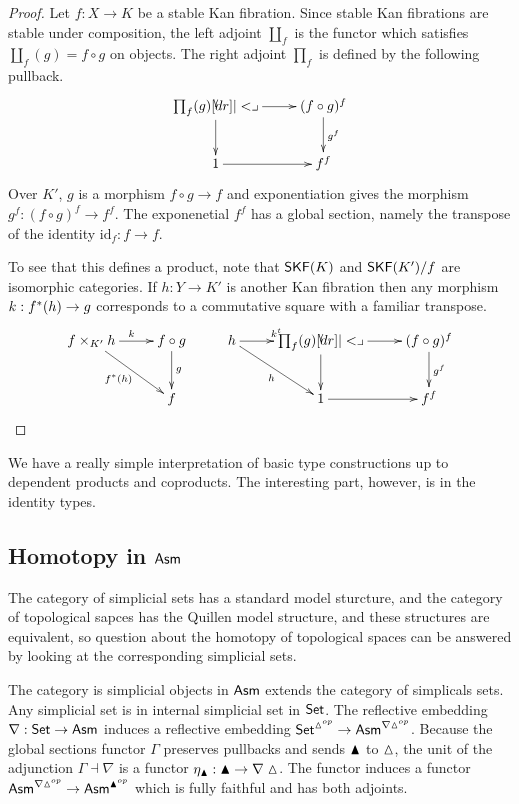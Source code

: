 \documentclass{amsart}
\theoremstyle{plain}
\theoremstyle{definition}
\newcommand\hide[1]{}
\newcommand\id{\mathrm{id}}
\begin{document}
\begin{proof} Let $f:X\to K$ be a stable Kan fibration. Since stable Kan fibrations are stable under composition, the left adjoint $\coprod_f$ is the functor which satisfies $\coprod_f(g) = f\circ g$ on objects. The right adjoint $\prod_f$ is defined by the following pullback.
\[\xymatrix{
\prod_f(g)\ar[r]\ar[d]\pb & (f\circ g)^f \ar[d]^{g^f} \\
1 \ar[r] & f^f
}\]
Over $K'$, $g$ is a morphism $f\circ g \to f$ and exponentiation gives the morphism $g^f: (f\circ g)^f \to f^f$. The exponenetial $f^f$ has a global section, namely the transpose of the identity $\id_f:f\to f$.

To see that this defines a product, note that $\mathsf{SKF}(K)$ and $\mathsf{SKF}(K')/f$ are isomorphic categories. If $h:Y\to K'$ is another Kan fibration then any morphism $k:f^*(h) \to g$ corresponds to a commutative square with a familiar transpose.
\[ \xymatrix{
f\times_{K'} h\ar[dr]_{f\ri(h)}\ar[r]^k & f\circ g \ar[d]^g & h \ar[r]^{k^t}\ar[dr]_h & \prod_f(g)\ar[r]\ar[d]\pb & (f\circ g)^f \ar[d]^{g^f} \\
& f & & 1 \ar[r] & f^f
}\]

\end{proof}\hide{ Beck Chevalley is voor linksadjuncten triviaal, en dus ook geldig voor rechtadjuncten }

We have a really simple interpretation of basic type constructions up to dependent products and coproducts. The interesting part, however, is in the identity types.

\subsection{Homotopy in $\mathsf{Asm}$}
The category of simplicial sets has a standard model sturcture, and the category of topological sapces has the Quillen model structure, and these structures are equivalent, so question about the homotopy of topological spaces can be answered by looking at the corresponding simplicial sets.

The category is simplicial objects in $\mathsf{Asm}$ extends the category of simplicals sets. Any simplicial set is in internal simplicial set in $\mathsf{Set}$. The reflective embedding $\nabla:\mathsf{Set}\to \mathsf{Asm}$ induces a reflective embedding $\mathsf{Set}^{\vartriangle^{op}} \to \mathsf{Asm}^{\nabla\vartriangle^{op}}$. Because the global sections functor $\Gamma$ preserves pullbacks and sends $\blacktriangle$ to $\vartriangle$, the unit of the adjunction $\Gamma\dashv \nabla$ is a functor $\eta_{\blacktriangle}:\blacktriangle \to \nabla \vartriangle$. The functor induces a functor $\mathsf{Asm}^{\nabla\vartriangle^{op}} \to \mathsf{Asm}^{\blacktriangle^{op}}$ which is fully faithful and has both adjoints. 
\end{document}
